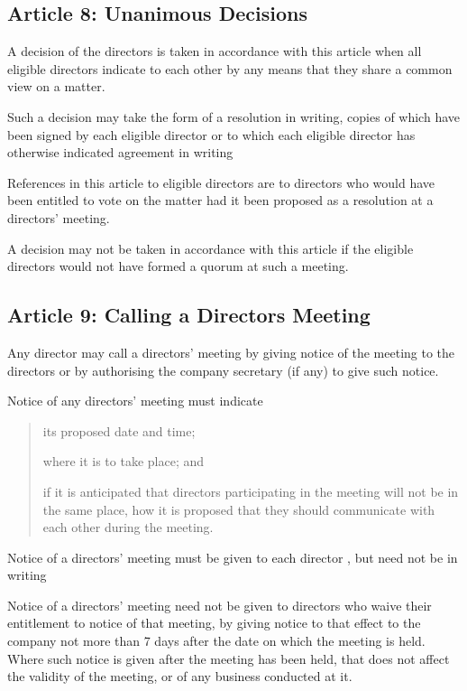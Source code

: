 \documentclass[letterpaper,10pt,english]{sphinxmanual}
\begin{document}
\subsection{Article 8: Unanimous Decisions}
\label{\detokenize{directors:article-8-unanimous-decisions}}\label{\detokenize{directors:article-8}}
 A decision of the directors is taken in accordance with this article when all eligible directors indicate to each other by any means that they share a common view on a matter.

 Such a decision may take the form of a resolution in writing, copies of which have been signed by each eligible director or to which each eligible director has otherwise indicated agreement in writing

 References in this article to eligible directors are to directors who would have been entitled to vote on the matter had it been proposed as a resolution at a directors’ meeting.

 A decision may not be taken in accordance with this article if the eligible directors would not have formed a quorum at such a meeting.


\subsection{Article 9: Calling a Directors Meeting}
\label{\detokenize{directors:article-9-calling-a-directors-meeting}}\label{\detokenize{directors:article-9}}
 Any director may call a directors’ meeting by giving notice of the meeting to the directors or by authorising the company secretary (if any) to give such notice.

 Notice of any directors’ meeting must indicate
\begin{quote}

 its proposed date and time;

 where it is to take place; and

 if it is anticipated that directors participating in the meeting will not be in the same place, how it is proposed that they should communicate with each other during the meeting.
\end{quote}

 Notice of a directors’ meeting must be given to each director , but need not be in writing

 Notice of a directors’ meeting need not be given to directors who waive their entitlement to notice of that meeting, by giving notice to that effect to the company not more than 7 days after the date on which the meeting is held. Where such notice is given after the meeting has been held, that does not affect the validity of the meeting, or of any business conducted at it.
\end{document}
